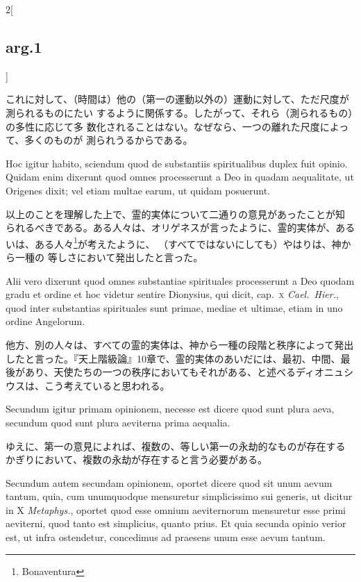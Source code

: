 \documentclass[paper=a4paper,fontsize=10pt,jafontsize=9pt,titlepage]{jlreq}
\begin{document}
\begin{paracol}{2}[\subsection{arg.1}]
\switchcolumn

これに対して、（時間は）他の（第一の運動以外の）運動に対して、ただ尺度が測られるものにたい
するように関係する。したがって、それら（測られるもの）の多性に応じて多
数化されることはない。なぜなら、一つの離れた尺度によって、多くのものが
測られうるからである。

\switchcolumn*

Hoc igitur habito, sciendum quod de substantiis spiritualibus duplex
fuit opinio.  Quidam enim dixerunt quod omnes processerunt a Deo in
quadam aequalitate, ut Origenes dixit; vel etiam multae earum, ut quidam
posuerunt.

\switchcolumn

以上のことを理解した上で、霊的実体について二通りの意見があったことが知
られるべきである。ある人々は、オリゲネスが言ったように、霊的実体が、あるいは、ある人々\footnote{Bonaventura}が考えたように、
（すべてではないにしても）やはりは、神から一種の
等しさにおいて発出したと言った。

\switchcolumn*

Alii vero dixerunt quod omnes substantiae spirituales processerunt a Deo
quodam gradu et ordine et hoc videtur sentire Dionysius, qui dicit,
cap.~{\scshape x} {\itshape Cael.~Hier.}, quod inter substantias spirituales
sunt primae, mediae et ultimae, etiam in uno ordine Angelorum.

\switchcolumn

他方、別の人々は、すべての霊的実体は、神から一種の段階と秩序によって発出
したと言った。『天上階級論』10章で、霊的実体のあいだには、最初、中間、最
後があり、天使たちの一つの秩序においてもそれがある、と述べるディオニュシ
ウスは、こう考えていると思われる。

\switchcolumn*

Secundum igitur primam opinionem, necesse est dicere quod sunt plura
aeva, secundum quod sunt plura aeviterna prima aequalia.

\switchcolumn

ゆえに、第一の意見によれば、複数の、等しい第一の永劫的なものが存在する
かぎりにおいて、複数の永劫が存在すると言う必要がある。

\switchcolumn*

Secundum autem secundam opinionem, oportet dicere quod sit
unum aevum tantum, quia, cum unumquodque mensuretur simplicissimo sui
generis, ut dicitur in X {\itshape Metaphys.}, oportet quod esse omnium
aeviternorum mensuretur esse primi aeviterni, quod tanto est simplicius,
quanto prius. Et quia secunda opinio verior est, ut infra ostendetur,
concedimus ad praesens unum esse aevum tantum.


\end{paracol}
\end{document}
